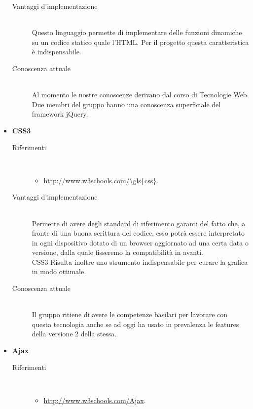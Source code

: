 \begin{itemize}
\begin{description}
		\item[Vantaggi d'implementazione]\ \\ 
		\noindent Questo linguaggio permette di implementare delle funzioni dinamiche su un codice statico quale l'HTML. Per il progetto \PROGETTO{} questa caratteristica è indispensabile.
		
		\item[Conoscenza attuale]\ \\ 
		\noindent Al momento le nostre conoscenze derivano dal corso di Tecnologie Web. \\ Due membri del gruppo hanno una conoscenza superficiale del framework jQuery.
	\end{description}
	
	\item \textbf{CSS3}
	\begin{description}
		\item[Riferimenti]\ 
		\noindent\begin{itemize}
			\item \url{http://www.w3schools.com/\gls{css}}.
		\end{itemize}
		
		\item[Vantaggi d'implementazione]\ \\ 
		\noindent Permette di avere degli standard di riferimento garanti del fatto che, a fronte di una buona scrittura del codice, esso potrà essere interpretato in ogni dispositivo dotato di un \gls{browser} aggiornato ad una certa data o versione, dalla quale fisseremo la compatibilità in avanti. \\ CSS3 Risulta inoltre uno strumento indispensabile per curare la grafica in modo ottimale.
		
		\item[Conoscenza attuale]\ \\ 
		\noindent Il gruppo ritiene di avere le competenze basilari per lavorare con questa tecnologia anche se ad oggi ha usato in prevalenza le features della versione 2 della stessa.
	\end{description}
	
	\item \textbf{Ajax}
	\begin{description}
		\item[Riferimenti]\ 
		\noindent\begin{itemize}
			\item \url{http://www.w3schools.com/Ajax}.
		\end{itemize}
		

\end{description}
\end{itemize}
